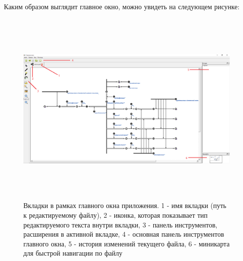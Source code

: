 Каким образом выглядит главное окно, можно увидеть на следующем рисунке:
\begin{figure}[h]
	\includegraphics[width=16.23cm, height=9.82cm]{../images/tabs.png}
	\caption{Вкладки в рамках главного окна приложения. 1 - имя вкладки (путь к редактируемому файлу), 2 - иконка, которая показывает
	тип редактируемого текста внутри вкладки, 3 - панель инструментов, расширения в активной вкладке, 4 - основная панель инструментов главного окна, 5 - история изменений текущего файла, 6 - миникарта для быстрой навигации по файлу}
	\label{pic_tabs}
\end{figure}
